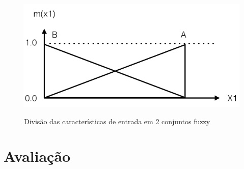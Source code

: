 \begin{figure}[h]
\caption{Divisão das características de entrada em 2 conjuntos fuzzy}
\centering
\includegraphics[scale=0.45]{conjuntos_fuzzy_entrada_final.png}
\label{figura:conjuntos_fuzzy_entrada_final}
\end{figure}

\section{Avaliação}

